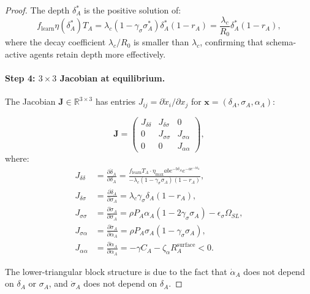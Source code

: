 \begin{proof}
The depth $\delta_A^*$ is the positive solution of:
\[
f_{\text{learn}} \eta(\delta_A^*) T_A = \lambda_c (1 - \gamma_\sigma \sigma_A^*) \delta_A^* (1 - r_A)
= \frac{\lambda_c}{R_0} \delta_A^* (1 - r_A),
\]
where the decay coefficient $\lambda_c / R_0$ is smaller than
$\lambda_c$, confirming that schema-active agents retain depth
more effectively.

\paragraph{Step 4: $3\times 3$ Jacobian at equilibrium.}
The Jacobian $\mathbf{J} \in \mathbb{R}^{3\times 3}$ has entries
$J_{ij} = \partial \dot{x}_i / \partial x_j$ for
$\mathbf{x} = (\delta_A, \sigma_A, \alpha_A)$:

\[
\mathbf{J} =
\begin{pmatrix}
J_{\delta\delta} & J_{\delta\sigma} & 0 \\
0 & J_{\sigma\sigma} & J_{\sigma\alpha} \\
0 & 0 & J_{\alpha\alpha}
\end{pmatrix},
\]
where:
\begin{align*}
J_{\delta\delta} &= \frac{\partial \dot{\delta}_A}{\partial \delta_A}
= \frac{f_{\text{learn}} T_A \cdot \eta_{\max} a b e^{-b\delta_A} e^{-a e^{-b\delta_A}}}
{- \lambda_c (1 - \gamma_\sigma \sigma_A)(1 - r_A)}, \\
J_{\delta\sigma} &= \frac{\partial \dot{\delta}_A}{\partial \sigma_A}
= \lambda_c \gamma_\sigma \delta_A (1 - r_A), \\
J_{\sigma\sigma} &= \frac{\partial \dot{\sigma}_A}{\partial \sigma_A}
= \rho P_A \alpha_A (1 - 2\gamma_\sigma \sigma_A) - \epsilon_\sigma \Omega_{SL}, \\
J_{\sigma\alpha} &= \frac{\partial \dot{\sigma}_A}{\partial \alpha_A}
= \rho P_A \sigma_A (1 - \gamma_\sigma \sigma_A), \\
J_{\alpha\alpha} &= \frac{\partial \dot{\alpha}_A}{\partial \alpha_A}
= -\gamma C_A - \zeta_\alpha R_A^{\text{surface}} < 0.
\end{align*}

The lower-triangular block structure is due to the fact that
$\dot{\alpha}_A$ does not depend on $\delta_A$ or $\sigma_A$, and
$\dot{\sigma}_A$ does not depend on $\delta_A$.


\end{proof}
